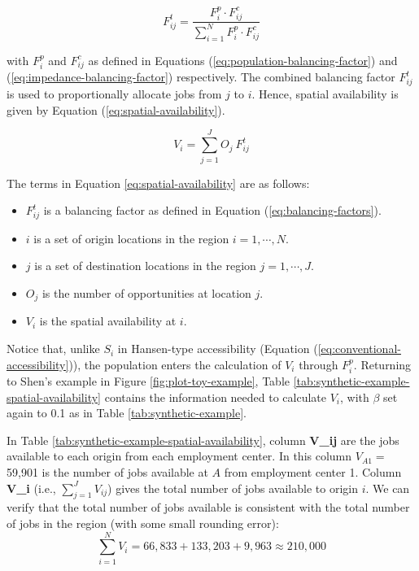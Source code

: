 \documentclass[]{elsarticle} %
\providecommand{\tightlist}{%
  \setlength{\itemsep}{0pt}\setlength{\parskip}{0pt}}
\begin{document}
\begin{equation}
\label{eq:balancing-factors}
F^t_{ij} = \frac{F^p_{i} \cdot F^c_{ij}}{\sum_{i=1}^N F^p_{i} \cdot F^c_{ij}}
\end{equation}

\noindent with \(F^p_{i}\) and \(F^c_{ij}\) as defined in Equations
(\ref{eq:population-balancing-factor}) and
(\ref{eq:impedance-balancing-factor}) respectively. The combined
balancing factor \(F^t_{ij}\) is used to proportionally allocate jobs
from \(j\) to \(i\). Hence, spatial availability is given by Equation
(\ref{eq:spatial-availability}).

\begin{equation}
\label{eq:spatial-availability}
V_{i} = \sum_{j=1}^J O_j\ F^t_{ij}
\end{equation}

The terms in Equation \ref{eq:spatial-availability} are as follows:

\begin{itemize}
\tightlist
\item
  \(F^t_{ij}\) is a balancing factor as defined in Equation
  (\ref{eq:balancing-factors}).
\item
  \(i\) is a set of origin locations in the region \(i = 1,\cdots, N\).
\item
  \(j\) is a set of destination locations in the region
  \(j = 1,\cdots,J\).
\item
  \(O_j\) is the number of opportunities at location \(j\).
\item
  \(V_{i}\) is the spatial availability at \(i\).
\end{itemize}

Notice that, unlike \(S_i\) in Hansen-type accessibility (Equation
(\ref{eq:conventional-accessibility})), the population enters the
calculation of \(V_{i}\) through \(F^p_i\). Returning to Shen's example
in Figure \ref{fig:plot-toy-example}, Table
\ref{tab:synthetic-example-spatial-availability} contains the
information needed to calculate \(V_i\), with \(\beta\) set again to 0.1
as in Table \ref{tab:synthetic-example}.

In Table \ref{tab:synthetic-example-spatial-availability}, column
\textbf{V\_ij} are the jobs available to each origin from each
employment center. In this column \(V_{A1}=\) 59,901 is the number of
jobs available at \(A\) from employment center 1. Column \textbf{V\_i}
(i.e., \(\sum_{j=1}^JV_{ij}\)) gives the total number of jobs available
to origin \(i\). We can verify that the total number of jobs available
is consistent with the total number of jobs in the region (with some
small rounding error): \[
\sum_{i=1}^N V_i = 66,833 + 133,203 + 9,963 \approx 210,000 
\]
\end{document}
